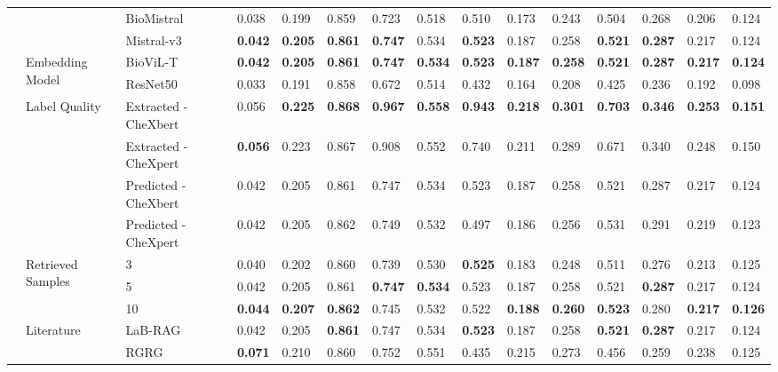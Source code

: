 \begin{tabular}{lllllllllllllll}
 &  & BioMistral & 0.038 & 0.199 & 0.859 & 0.723 & 0.518 & 0.510 & 0.173 & 0.243 & 0.504 & 0.268 & 0.206 & 0.124 \\
 &  & Mistral-v3 & \textbf{0.042} & \textbf{0.205} & \textbf{0.861} & \textbf{0.747} & 0.534 & \textbf{0.523} & 0.187 & 0.258 & \textbf{0.521} & \textbf{0.287} & 0.217 & 0.124 \\
\cmidrule{2-15}
 & \multirow[c]{2}{*}{Embedding Model} & BioViL-T & \textbf{0.042} & \textbf{0.205} & \textbf{0.861} & \textbf{0.747} & \textbf{0.534} & \textbf{0.523} & \textbf{0.187} & \textbf{0.258} & \textbf{0.521} & \textbf{0.287} & \textbf{0.217} & \textbf{0.124} \\
 &  & ResNet50 & 0.033 & 0.191 & 0.858 & 0.672 & 0.514 & 0.432 & 0.164 & 0.208 & 0.425 & 0.236 & 0.192 & 0.098 \\
\cmidrule{2-15}
 & \multirow[c]{4}{*}{Label Quality} & Extracted - CheXbert & 0.056 & \textbf{0.225} & \textbf{0.868} & \textbf{0.967} & \textbf{0.558} & \textbf{0.943} & \textbf{0.218} & \textbf{0.301} & \textbf{0.703} & \textbf{0.346} & \textbf{0.253} & \textbf{0.151} \\
 &  & Extracted - CheXpert & \textbf{0.056} & 0.223 & 0.867 & 0.908 & 0.552 & 0.740 & 0.211 & 0.289 & 0.671 & 0.340 & 0.248 & 0.150 \\
 &  & Predicted - CheXbert & 0.042 & 0.205 & 0.861 & 0.747 & 0.534 & 0.523 & 0.187 & 0.258 & 0.521 & 0.287 & 0.217 & 0.124 \\
 &  & Predicted - CheXpert & 0.042 & 0.205 & 0.862 & 0.749 & 0.532 & 0.497 & 0.186 & 0.256 & 0.531 & 0.291 & 0.219 & 0.123 \\
\cmidrule{2-15}
 & \multirow[c]{3}{*}{Retrieved Samples} & 3 & 0.040 & 0.202 & 0.860 & 0.739 & 0.530 & \textbf{0.525} & 0.183 & 0.248 & 0.511 & 0.276 & 0.213 & 0.125 \\
 &  & 5 & 0.042 & 0.205 & 0.861 & \textbf{0.747} & \textbf{0.534} & 0.523 & 0.187 & 0.258 & 0.521 & \textbf{0.287} & 0.217 & 0.124 \\
 &  & 10 & \textbf{0.044} & \textbf{0.207} & \textbf{0.862} & 0.745 & 0.532 & 0.522 & \textbf{0.188} & \textbf{0.260} & \textbf{0.523} & 0.280 & \textbf{0.217} & \textbf{0.126} \\
\cmidrule{2-15}
 & \multirow[c]{4}{*}{Literature} & LaB-RAG & 0.042 & 0.205 & \textbf{0.861} & 0.747 & 0.534 & \textbf{0.523} & 0.187 & 0.258 & \textbf{0.521} & \textbf{0.287} & 0.217 & 0.124 \\
 &  & RGRG & \textbf{0.071} & 0.210 & 0.860 & 0.752 & 0.551 & 0.435 & 0.215 & 0.273 & 0.456 & 0.259 & 0.238 & 0.125 \\

\end{tabular}
